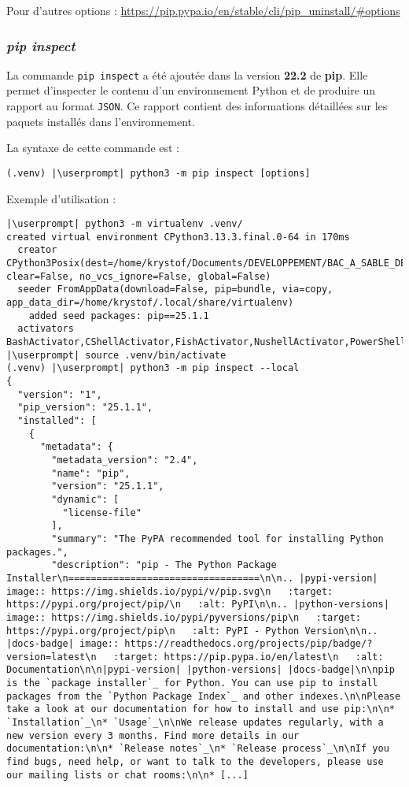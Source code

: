 Pour d'autres options : \url{https://pip.pypa.io/en/stable/cli/pip_uninstall/\#options}

\subsubsection*{\textit{pip inspect}}
La commande \texttt{pip inspect} a été ajoutée dans la version \textbf{22.2} de \textbf{pip}. Elle permet d'inspecter le contenu d'un environnement Python et de produire un rapport au format \texttt{JSON}. Ce rapport contient des informations détaillées sur les paquets installés dans l'environnement.

La syntaxe de cette commande est :
\begin{lstlisting}[style=bash]
(.venv) |\userprompt| python3 -m pip inspect [options]
\end{lstlisting}

Exemple d'utilisation :
\begin{lstlisting}[style=bash]
|\userprompt| python3 -m virtualenv .venv/
created virtual environment CPython3.13.3.final.0-64 in 170ms
  creator CPython3Posix(dest=/home/krystof/Documents/DEVELOPPEMENT/BAC_A_SABLE_DE_CODES/Python/TEST_PIP_INSPECT/.venv, clear=False, no_vcs_ignore=False, global=False)
  seeder FromAppData(download=False, pip=bundle, via=copy, app_data_dir=/home/krystof/.local/share/virtualenv)
    added seed packages: pip==25.1.1
  activators BashActivator,CShellActivator,FishActivator,NushellActivator,PowerShellActivator,PythonActivator
|\userprompt| source .venv/bin/activate
(.venv) |\userprompt| python3 -m pip inspect --local
{
  "version": "1",
  "pip_version": "25.1.1",
  "installed": [
    {
      "metadata": {
        "metadata_version": "2.4",
        "name": "pip",
        "version": "25.1.1",
        "dynamic": [
          "license-file"
        ],
        "summary": "The PyPA recommended tool for installing Python packages.",
        "description": "pip - The Python Package Installer\n==================================\n\n.. |pypi-version| image:: https://img.shields.io/pypi/v/pip.svg\n   :target: https://pypi.org/project/pip/\n   :alt: PyPI\n\n.. |python-versions| image:: https://img.shields.io/pypi/pyversions/pip\n   :target: https://pypi.org/project/pip\n   :alt: PyPI - Python Version\n\n.. |docs-badge| image:: https://readthedocs.org/projects/pip/badge/?version=latest\n   :target: https://pip.pypa.io/en/latest\n   :alt: Documentation\n\n|pypi-version| |python-versions| |docs-badge|\n\npip is the `package installer`_ for Python. You can use pip to install packages from the `Python Package Index`_ and other indexes.\n\nPlease take a look at our documentation for how to install and use pip:\n\n* `Installation`_\n* `Usage`_\n\nWe release updates regularly, with a new version every 3 months. Find more details in our documentation:\n\n* `Release notes`_\n* `Release process`_\n\nIf you find bugs, need help, or want to talk to the developers, please use our mailing lists or chat rooms:\n\n* [...]
\end{lstlisting}

